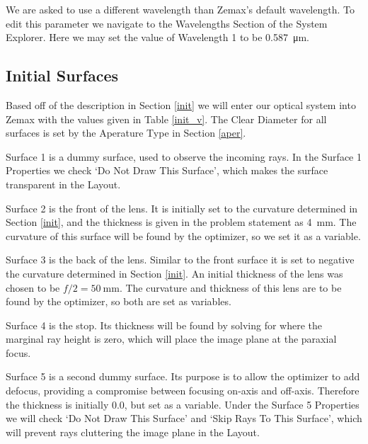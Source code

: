 \documentclass[10pt,a4paper]{article}
\begin{document}
		We are asked to use a different wavelength than Zemax's default wavelength. To edit this parameter we navigate to the Wavelengths Section of the System Explorer. Here we may set the value of Wavelength 1 to be \SI{0.587}{\micro\meter}.
	
	\subsection{Initial Surfaces}
	
		Based off of the description in Section \ref{init} we will enter our optical system into Zemax with the values given in Table \ref{init_v}. The Clear Diameter for all surfaces is set by the Aperature Type in Section \ref{aper}.	
		
		Surface 1 is a dummy surface, used to observe the incoming rays. In the Surface 1 Properties we check `Do Not Draw This Surface', which makes the surface transparent in the Layout.
		
		Surface 2 is the front of the lens. It is initially set to the curvature determined in Section \ref{init}, and the thickness is given in the problem statement as \SI{4}{\milli \meter}. The curvature of this surface will be found by the optimizer, so we set it as a variable.
		
		Surface 3 is the back of the lens. Similar to the front surface it is set to negative the curvature determined in Section \ref{init}. An initial thickness of the lens was chosen to be $f/2=\SI{50}{\milli \meter}$. The curvature and thickness of this lens are to be found by the optimizer, so both are set as variables.
		
		Surface 4 is the stop. Its thickness will be found by solving for where the marginal ray height is zero, which will place the image plane at the paraxial focus.
		
		Surface 5 is a second dummy surface. Its purpose is to allow the optimizer to add defocus, providing a compromise between focusing on-axis and off-axis. Therefore the thickness is initially 0.0, but set as a variable. Under the Surface 5 Properties we will check `Do Not Draw This Surface' and `Skip Rays To This Surface', which will prevent rays cluttering the image plane in the Layout.
	
\end{document}
